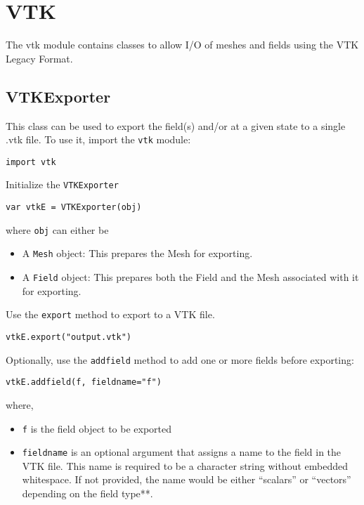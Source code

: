 \hypertarget{vtk}{%
\section{VTK}\label{vtk}}

The vtk module contains classes to allow I/O of meshes and fields using
the VTK Legacy Format.

\hypertarget{vtkexporter}{%
\subsection{VTKExporter}\label{vtkexporter}}

This class can be used to export the field(s) and/or at a given state to
a single .vtk file. To use it, import the \texttt{vtk} module:

\begin{lstlisting}
import vtk
\end{lstlisting}

Initialize the \texttt{VTKExporter}

\begin{lstlisting}
var vtkE = VTKExporter(obj)
\end{lstlisting}

where \texttt{obj} can either be

\begin{itemize}

\item
  A \texttt{Mesh} object: This prepares the Mesh for exporting.
\item
  A \texttt{Field} object: This prepares both the Field and the Mesh
  associated with it for exporting.
\end{itemize}

Use the \texttt{export} method to export to a VTK file.

\begin{lstlisting}
vtkE.export("output.vtk")
\end{lstlisting}

Optionally, use the \texttt{addfield} method to add one or more fields
before exporting:

\begin{lstlisting}
vtkE.addfield(f, fieldname="f")
\end{lstlisting}

where,

\begin{itemize}

\item
  \texttt{f} is the field object to be exported
\item
  \texttt{fieldname} is an optional argument that assigns a name to the
  field in the VTK file. This name is required to be a character string
  without embedded whitespace. If not provided, the name would be either
  ``scalars'' or ``vectors'' depending on the field type**.
\end{itemize}


